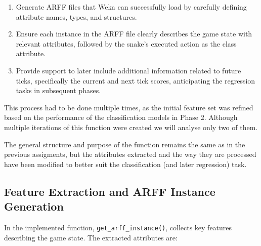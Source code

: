\documentclass[12pt,a4paper]{article}
\begin{document}
\begin{enumerate}
    \item Generate ARFF files that Weka can successfully load by carefully defining attribute names, types, and structures.
    \item Ensure each instance in the ARFF file clearly describes the game state with relevant attributes, followed by the snake's executed action as the class attribute.
    \item Provide support to later include additional information related to future ticks, specifically the current and next tick scores, anticipating the regression tasks in subsequent phases.
\end{enumerate}

This process had to be done multiple times, as the initial feature set was refined based on the performance of the classification models in Phase 2.
Although multiple iterations of this function were created we will analyse only two of them.

The general structure and purpose of the function remains the same as in the previous assigments, but the attributes extracted and the way they are processed have been modified to better suit the classification (and later regression) task.

\subsection{Feature Extraction and ARFF Instance Generation}

In the implemented function, \texttt{get\_arff\_instance()}, collects key features describing the game state. The extracted attributes are:
\end{document}
